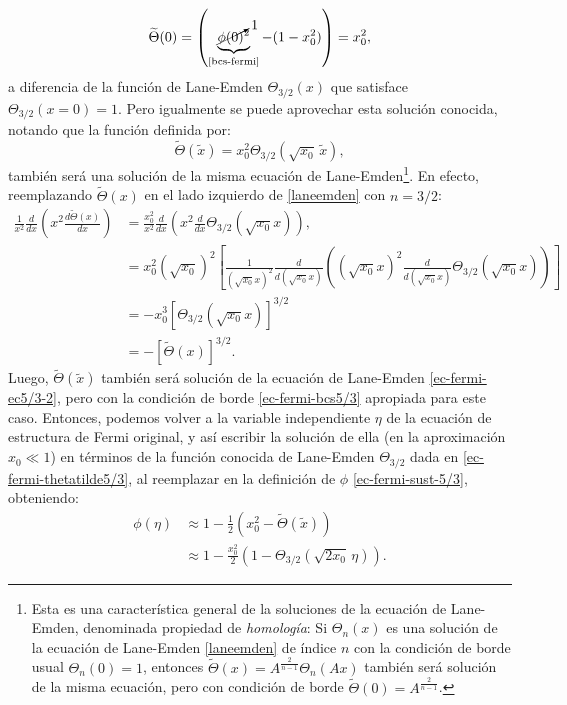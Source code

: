 \begin{align}\label{ec-fermi-bcs5/3}
 \widetilde{\Theta}(0)=\left(\underbrace{\cancelto{1}{\phi(0)}^2}_{\text{\eqref{bcs-fermi}}}-(1-x_0^2)\right)=x_0^2,
\end{align}
a diferencia de la función de Lane-Emden $\Theta_{3/2}(x)$ que satisface $\Theta_{3/2}(x=0)=1$. Pero igualmente se puede aprovechar esta solución conocida, notando que la función definida por:
\begin{equation}\label{ec-fermi-thetatilde5/3}
 \widetilde{\Theta}(\widetilde{x})=x_0^2\Theta_{3/2}(\sqrt{x_0} \,\widetilde{x}),
\end{equation}
también será una solución de la misma ecuación de Lane-Emden\footnote{Esta es una característica general de la soluciones de la ecuación de Lane-Emden, denominada propiedad de \emph{homología}: Si $\Theta_n(x)$ es una solución de la ecuación de Lane-Emden \eqref{laneemden} de índice $n$ con la condición de borde usual $\Theta_n(0)=1$, entonces $\widetilde{\Theta}(x)=A^{\frac{2}{n-1}}\Theta_n(Ax)$ también será solución de la misma ecuación, pero con condición de borde $\widetilde{\Theta}(0)=A^{\frac{2}{n-1}}$.}. En efecto, reemplazando $\widetilde{\Theta}(x)$ en el lado izquierdo de \eqref{laneemden} con $n=3/2$:
\begin{align} \frac{1}{x^2}\frac{d}{dx}\left(x^2\frac{d\widetilde{\Theta}(x)}{dx}\right)&=\frac{x_0^2}{x^2}\frac{d}{dx}\left(x^2\frac{d}{dx}\Theta_{3/2}(\sqrt{x_0}x)\right),\\
&=x_0^2(\sqrt{x_0})^2\left[\frac{1}{(\sqrt{x_0}x)^2}\frac{d}{d(\sqrt{x_0}x)}\left((\sqrt{x_0}x)^2\frac{d}{d(\sqrt{x_0}x)}\Theta_{3/2}(\sqrt{x_0}x)\right)\right]\\
&=-x_0^3\left[\Theta_{3/2}(\sqrt{x_0}x)\right]^{3/2}\\
&=-\left[\widetilde{\Theta}(x)\right]^{3/2}.
\end{align}
Luego, $\widetilde{\Theta}(\widetilde{x})$ también será solución de la ecuación de Lane-Emden \eqref{ec-fermi-ec5/3-2}, pero con la condición de borde \eqref{ec-fermi-bcs5/3} apropiada para este caso. Entonces, podemos volver a la variable independiente $\eta$ de la ecuación de estructura de Fermi original, y así escribir la solución de ella (en la aproximación $x_0\ll1$) en términos de la función conocida de Lane-Emden $\Theta_{3/2}$ dada en \eqref{ec-fermi-thetatilde5/3}, al reemplazar en la definición de $\phi$  \eqref{ec-fermi-sust-5/3}, obteniendo:
\begin{align}
 \phi(\eta)&\approx1-\frac{1}{2}\left(x_0^2-\widetilde{\Theta}(\widetilde{x})\right)\\
&\approx1-\frac{x_0^2}{2}\left(1-\Theta_{3/2}(\sqrt{2x_0} \,\eta)\right).\label{ec-fermi-phi5/3}
\end{align}


